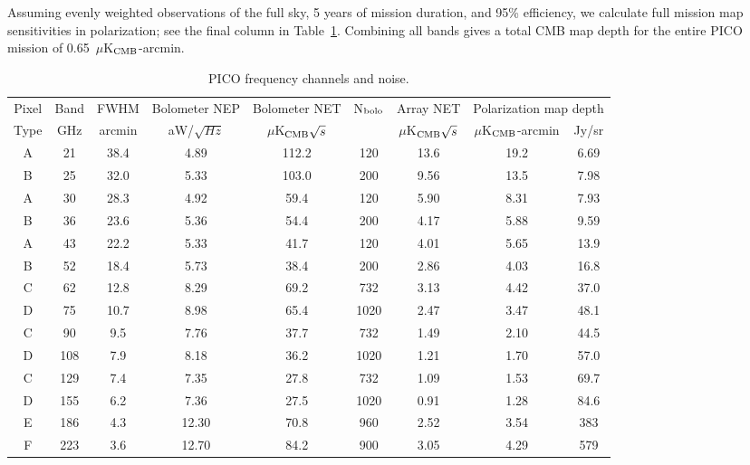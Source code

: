 \documentclass[]{spie}  %
\begin{document}
Assuming evenly weighted observations 
of the full sky, 5 years of mission duration, and 95\% efficiency, we calculate full mission map sensitivities in polarization; see the 
final column in Table~\ref{tab:noise}. 
Combining all bands gives a total CMB map depth for the entire PICO mission of 0.65~$\mu$K$_{\rm CMB}$-arcmin. 

\begin{table}[ht]
\centering
\caption{PICO frequency channels and noise. }
\label{tab:noise}
\begin{tabular}{|c|c|c|c|c|c|c|cc|}
\hline
Pixel  & Band  & FWHM   & Bolometer NEP & Bolometer NET        & N$_{\rm bolo}$ & Array NET         & \multicolumn{2}{|c|}{Polarization map depth}  \\
Type  & GHz   & arcmin    & aW/$\sqrt{Hz}$ & $\mu$K$_{\rm CMB} \sqrt{s}$ &            & $\mu$K$_{\rm CMB}\sqrt{s}$ & $\mu$K$_{\rm CMB}$-arcmin & Jy/sr     \\ \hline
A        & 21  & 38.4 & 4.89   & 112.2   & 120   & 13.6  & 19.2  & 6.69 \\
B        & 25  & 32.0 & 5.33   & 103.0   & 200   & 9.56   & 13.5 & 7.98  \\
A        & 30  & 28.3 & 4.92   & 59.4    & 120   & 5.90   & 8.31 & 7.93   \\
B        & 36  & 23.6 & 5.36   & 54.4    & 200   & 4.17   & 5.88 & 9.59   \\
A        & 43  & 22.2 & 5.33   & 41.7    & 120   & 4.01   & 5.65 & 13.9   \\
B        & 52  & 18.4 & 5.73   & 38.4    & 200   & 2.86   & 4.03 & 16.8   \\
C        & 62  & 12.8 & 8.29   & 69.2    & 732   & 3.13   & 4.42 & 37.0   \\
D        & 75  & 10.7 & 8.98   & 65.4    & 1020  & 2.47   & 3.47 & 48.1   \\
C        & 90  & 9.5  & 7.76    & 37.7    & 732   & 1.49   & 2.10 & 44.5   \\
D        & 108 & 7.9  & 8.18   & 36.2    & 1020  & 1.21   & 1.70 & 57.0   \\
C        & 129 & 7.4  & 7.35   & 27.8    & 732   & 1.09   & 1.53 & 69.7   \\
D        & 155 & 6.2  & 7.36   & 27.5    & 1020  & 0.91   & 1.28 & 84.6   \\
E        & 186 & 4.3  & 12.30 & 70.8    & 960   & 2.52   & 3.54 & 383    \\
F        & 223 & 3.6  & 12.70 & 84.2    & 900   & 3.05   & 4.29 & 579    \\

\end{tabular}
\end{table}
\end{document}
